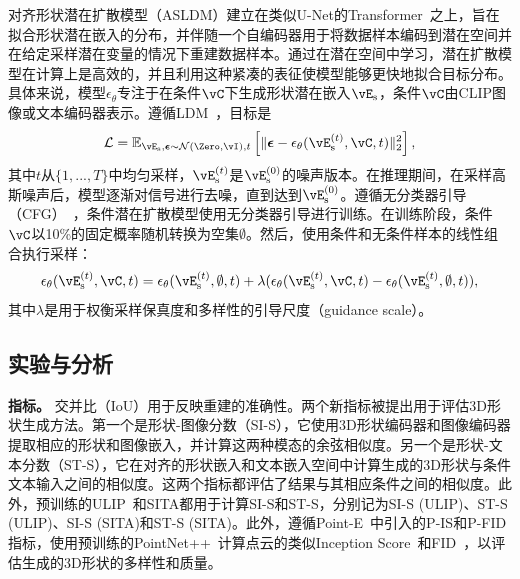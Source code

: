 \documentclass[../../book-main_zh.tex]{subfiles}
\begin{document}
对齐形状潜在扩散模型（ASLDM）建立在类似U-Net的Transformer~\cite{10203178}之上，旨在拟合形状潜在嵌入的分布，并伴随一个自编码器用于将数据样本编码到潜在空间并在给定采样潜在变量的情况下重建数据样本。通过在潜在空间中学习，潜在扩散模型在计算上是高效的，并且利用这种紧凑的表征使模型能够更快地拟合目标分布。具体来说，模型$\epsilon_{\theta}$专注于在条件$\vC$下生成形状潜在嵌入$\vE_{\mathrm{s}}$，条件$\vC$由CLIP图像或文本编码器表示。遵循LDM~\cite{rombach2022high}，目标是
\begin{equation}
\mathcal{L} = \mathbb{E}_{\vE_{\mathrm{s}}, \boldsymbol{\epsilon} \sim
\mathcal{N}(\Zero,\vI),t} \left[ \Vert \boldsymbol{\epsilon}
- \epsilon_\theta(\vE_{\mathrm{s}}^{(t)}, \vC, t) \Vert^2_2 \right],
\end{equation}
其中$t$从$\{1, ..., T\}$中均匀采样，$\vE_{\mathrm{s}}^{(t)}$是$\vE_{\mathrm{s}}^{(0)}$的噪声版本。在推理期间，在采样高斯噪声后，模型逐渐对信号进行去噪，直到达到$\vE_{\mathrm{s}}^{(0)}$。遵循无分类器引导（CFG）~\cite{ho2021classifierfree}，条件潜在扩散模型使用无分类器引导进行训练。在训练阶段，条件$\vC$以10\%的固定概率随机转换为空集$\emptyset$。然后，使用条件和无条件样本的线性组合执行采样：
\begin{equation}
\epsilon_\theta ( \vE_{\mathrm{s}}^{(t)}, \vC, t ) = \epsilon_\theta(
\vE_{\mathrm{s}}^{(t)}, \emptyset, t ) + \lambda
( \epsilon_\theta( \vE_{\mathrm{s}}^{(t)}, \vC, t ) -\epsilon_\theta(
\vE_{\mathrm{s}}^{(t)}, \emptyset, t ) ),
\label{eq:cfg-michelangelo}
\end{equation}
其中$\lambda$是用于权衡采样保真度和多样性的引导尺度（guidance scale）。

\subsection{实验与分析}

\textbf{指标。}
交并比（IoU）用于反映重建的准确性。两个新指标被提出用于评估3D形状生成方法。第一个是形状-图像分数（SI-S），它使用3D形状编码器和图像编码器提取相应的形状和图像嵌入，并计算这两种模态的余弦相似度。另一个是形状-文本分数（ST-S），它在对齐的形状嵌入和文本嵌入空间中计算生成的3D形状与条件文本输入之间的相似度。这两个指标都评估了结果与其相应条件之间的相似度。此外，预训练的ULIP~\cite{10203465}和SITA都用于计算SI-S和ST-S，分别记为SI-S (ULIP)、ST-S (ULIP)、SI-S (SITA)和ST-S (SITA)。此外，遵循Point-E~\cite{nichol2022point}中引入的P-IS和P-FID指标，使用预训练的PointNet++~\cite{NIPS2017_d8bf84be}计算点云的类似Inception Score~\cite{NIPS2016_8a3363ab}和FID~\cite{NIPS2017_8a1d6947}，以评估生成的3D形状的多样性和质量。
\end{document}
